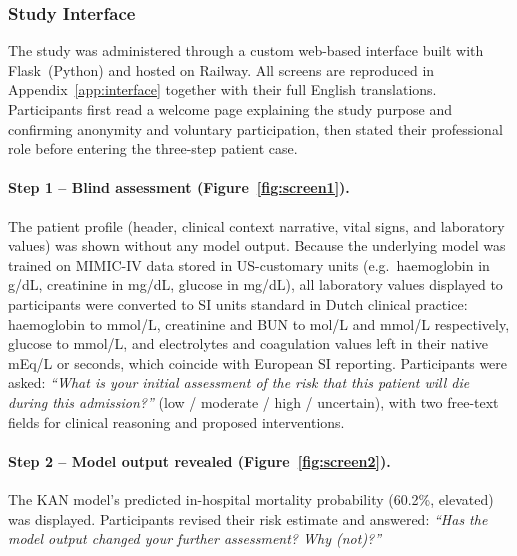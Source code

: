 \documentclass[12pt, a4paper]{article}
\begin{document}
\subsubsection{Study Interface}
\label{sec:study_interface}

The study was administered through a custom web-based interface built with
Flask~(Python) and hosted on Railway. All screens are reproduced in
Appendix~\ref{app:interface}
together with their full English translations. Participants first read a
welcome page explaining the study purpose and confirming anonymity and
voluntary participation, then stated their professional role before
entering the three-step patient case.

\paragraph*{Step 1 -- Blind assessment (Figure~\ref{fig:screen1}).}
The patient profile (header, clinical context narrative, vital signs, and
laboratory values) was shown without any model output.
Because the underlying model was trained on MIMIC-IV data stored in
US-customary units (e.g.\ haemoglobin in g/dL, creatinine in mg/dL,
glucose in mg/dL), all laboratory values displayed to participants were
converted to SI units standard in Dutch clinical practice: haemoglobin
to mmol/L, creatinine and BUN to \textmu{}mol/L and mmol/L respectively,
glucose to mmol/L, and electrolytes and coagulation values left in
their native mEq/L or seconds, which coincide with European SI reporting.
Participants were asked: \emph{``What is your initial assessment of the
risk that this patient will die during this admission?''} (low / moderate /
high / uncertain), with two free-text fields for clinical reasoning and
proposed interventions.

\paragraph*{Step 2 -- Model output revealed (Figure~\ref{fig:screen2}).}
The KAN model's predicted in-hospital mortality probability (60.2\%,
elevated) was displayed. Participants revised their risk estimate and
answered: \emph{``Has the model output changed your further assessment?
Why (not)?''}
\end{document}
